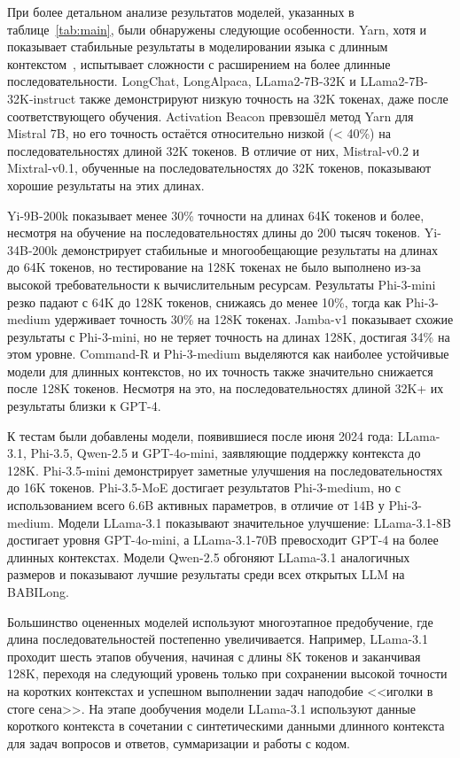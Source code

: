 При более детальном анализе результатов моделей, указанных в таблице~\ref{tab:main}, были обнаружены следующие особенности. Yarn, хотя и показывает стабильные результаты в моделировании языка с длинным контекстом~\cite{peng2023yarn}, испытывает сложности с расширением на более длинные последовательности. LongChat, LongAlpaca, LLama2-7B-32K и LLama2-7B-32K-instruct также демонстрируют низкую точность на 32K токенах, даже после соответствующего обучения. Activation Beacon превзошёл метод Yarn для Mistral 7B, но его точность остаётся относительно низкой (< 40\%) на последовательностях длиной 32K токенов. В отличие от них, Mistral-v0.2 и Mixtral-v0.1, обученные на последовательностях до 32K токенов, показывают хорошие результаты на этих длинах.  

Yi-9B-200k показывает менее 30\% точности на длинах 64K токенов и более, несмотря на обучение на последовательностях длины до 200 тысяч токенов. Yi-34B-200k демонстрирует стабильные и многообещающие результаты на длинах до 64K токенов, но тестирование на 128K токенах не было выполнено из-за высокой требовательности к вычислительным ресурсам. Результаты Phi-3-mini резко падают с 64K до 128K токенов, снижаясь до менее 10\%, тогда как Phi-3-medium удерживает точность 30\% на 128K токенах. Jamba-v1 показывает схожие результаты с Phi-3-mini, но не теряет точность на длинах 128K, достигая 34\% на этом уровне. Command-R и Phi-3-medium выделяются как наиболее устойчивые модели для длинных контекстов, но их точность также значительно снижается после 128K токенов. Несмотря на это, на последовательностях длиной 32K+ их результаты близки к GPT-4. 

К тестам были добавлены модели, появившиеся после июня 2024 года: LLama-3.1, Phi-3.5, Qwen-2.5 и GPT-4o-mini, заявляющие поддержку контекста до 128K. Phi-3.5-mini демонстрирует заметные улучшения на последовательностях до 16K токенов. Phi-3.5-MoE достигает результатов Phi-3-medium, но с использованием всего 6.6B активных параметров, в отличие от 14B у Phi-3-medium. Модели LLama-3.1 показывают значительное улучшение: LLama-3.1-8B достигает уровня GPT-4o-mini, а LLama-3.1-70B превосходит GPT-4 на более длинных контекстах. Модели Qwen-2.5 обгоняют LLama-3.1 аналогичных размеров и показывают лучшие результаты среди всех открытых LLM на BABILong.  

Большинство оцененных моделей используют многоэтапное предобучение, где длина последовательностей постепенно увеличивается. Например, LLama-3.1~\cite{dubey2024llama3} проходит шесть этапов обучения, начиная с длины 8K токенов и заканчивая 128K, переходя на следующий уровень только при сохранении высокой точности на коротких контекстах и успешном выполнении задач наподобие <<иголки в стоге сена>>. На этапе дообучения модели LLama-3.1 используют данные короткого контекста в сочетании с синтетическими данными длинного контекста для задач вопросов и ответов, суммаризации и работы с кодом.  

